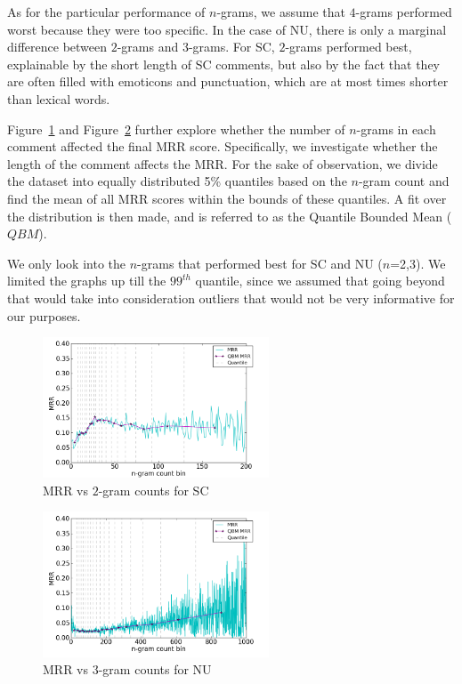 As for the particular performance of $n$-grams, we assume that $4$-grams performed worst because they were too specific. In the case of NU, there is only a marginal difference between $2$-grams and $3$-grams. For SC, $2$-grams performed best, explainable by the short length of SC comments, but also by the fact that they are
 often filled with emoticons and punctuation, which are at most times shorter than lexical words.

Figure~\ref{fig:sc_feat_mrr} and Figure~\ref{fig:nu_feat_mrr} further explore whether the number of $n$-grams in each comment affected the final MRR score. Specifically, we investigate whether the length of the comment affects the MRR. For the sake of observation, we divide the dataset into equally distributed 5\% quantiles based on the $n$-gram count and find the mean of all MRR scores within the bounds of these quantiles. A fit over the distribution is then made, and is referred to as the Quantile Bounded Mean ($QBM$).

We only look into the $n$-grams that performed best for SC and NU ($n$=2,3). We limited the graphs up till the $99^{th}$ quantile, since we assumed that going beyond that would take into consideration outliers that would not be very informative for our purposes. 

\begin{figure}[!h]
\centering
\includegraphics[width=0.6\textwidth]{c-inv_images/sc_feat_mrr.png}
\caption{MRR vs $2$-gram counts for SC}
\label{fig:sc_feat_mrr}
\end{figure}

\begin{figure}[!h]
\centering
\includegraphics[width=0.6\textwidth]{c-inv_images/nu_feat_mrr.png}
\caption{MRR vs $3$-gram counts for NU}
\label{fig:nu_feat_mrr}
\end{figure}

